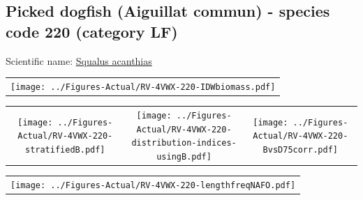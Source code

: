 \documentclass[12pt]{article}\usepackage[]{graphicx}\usepackage[]{color}
\begin{document}
\renewcommand\thefigure{\thesubsection\Alph{figure}}

\setcounter{figure}{0}

\hypertarget{sec:220}{%
\subsection{Picked dogfish (Aiguillat commun) - species code 220 (category LF)}\label{sec:220}}

  


Scientific name: \href{http://www.marinespecies.org/aphia.php?p=taxdetails\&id=105923}{Squalus acanthias} \newline
\begin{minipage}{1.0\textwidth}
 \begin{tabular}{c}
\texttt{[image: ../Figures-Actual/RV-4VWX-220-IDWbiomass.pdf]} \\ 
\end{tabular} 
\end{minipage}
\newline

\vspace{1cm}
\begin{minipage}{1.0\textwidth}
 \begin{tabular}{ccc}
\texttt{[image: ../Figures-Actual/RV-4VWX-220-stratifiedB.pdf]} & 
\texttt{[image: ../Figures-Actual/RV-4VWX-220-distribution-indices-usingB.pdf]} & 
\texttt{[image: ../Figures-Actual/RV-4VWX-220-BvsD75corr.pdf]} \\ 
\end{tabular} 
\end{minipage}
\clearpage
\begin{minipage}{1.0\textwidth}
 \begin{tabular}{c}
\texttt{[image: ../Figures-Actual/RV-4VWX-220-lengthfreqNAFO.pdf]} \\ 
\end{tabular} 
\end{minipage}
\newline
\end{document}
